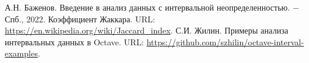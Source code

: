\newpage


\begin{thebibliography}{}
	  А.Н. Баженов. Введение в анализ данных с интервальной неопределенностью. $-$ Спб., 2022.
	  Коэффициент Жаккара. URL: \url{https://en.wikipedia.org/wiki/Jaccard_index}. 
	  С.И. Жилин. Примеры анализа интервальных данных в Octave. URL: \url{https://github.com/szhilin/octave-interval-examples}. 
\end{thebibliography}